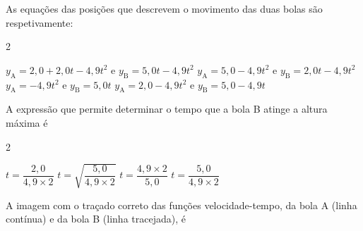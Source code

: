 \documentclass[addpoints,answers]{exam}
\begin{document}
\begin{questions}
{		\vspace{5pt} 
		\begin{minipage}{\linewidth}
			\vspace{3pt}
			\centering
		\end{minipage}
		
		}
		
		\vspace{5pt}
		\question[10] As equações das posições que descrevem o movimento das duas bolas são respetivamente:
		
		\begin{multicols}{2}
			\begin{randomizechoices}
				\correctchoice $y_{\text{A}} = 2,0 + 2,0 t - 4,9 t^2$ e $y_{\text{B}} = 5,0 t - 4,9 t^2$
				\choice $y_{\text{A}} = 5,0 - 4,9 t^2$ e $y_{\text{B}} = 2,0 t - 4,9 t^2$
				\choice $y_{\text{A}} = - 4,9 t^2$ e $y_{\text{B}} = 5,0 t$
				\choice $y_{\text{A}} = 2,0 - 4,9 t^2$ e $y_{\text{B}} = 5,0 - 4,9 t$
			\end{randomizechoices}
		\end{multicols}
		
		\vspace{5pt}
		\question[10] A expressão que permite determinar o tempo que a bola B atinge a altura máxima é\\
		\begin{multicols}{2}
			\begin{randomizechoices}
				\choice $t = \dfrac{2,0}{4,9 \times 2}$
				\choice $t = \sqrt{\dfrac{5,0}{4,9 \times 2}}$
				\choice $t = \dfrac{4,9 \times 2}{5,0}$
				\correctchoice $t = \dfrac{5,0}{4,9 \times 2}$
			\end{randomizechoices}
		\end{multicols}
		
		\vspace{5pt}
		\question[10] A imagem com o traçado correto das funções velocidade-tempo, da bola A (linha contínua) e da bola B (linha tracejada), é
		

\end{questions}
\end{document}

